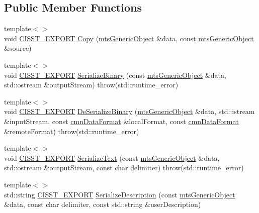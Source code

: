 \subsection*{Public Member Functions}
\begin{DoxyCompactItemize}
\item 
{\footnotesize template$<$$>$ }\\void \hyperlink{cmn_export_macros_8h_a99393e0c3ac434b2605235bbe20684f8}{C\-I\-S\-S\-T\-\_\-\-E\-X\-P\-O\-R\-T} \hyperlink{classcmn_data_a2804cf73512f6dd28850d02814f4d0ed}{Copy} (\hyperlink{classmts_generic_object}{mts\-Generic\-Object} \&data, const \hyperlink{classmts_generic_object}{mts\-Generic\-Object} \&source)
\item 
{\footnotesize template$<$$>$ }\\void \hyperlink{cmn_export_macros_8h_a99393e0c3ac434b2605235bbe20684f8}{C\-I\-S\-S\-T\-\_\-\-E\-X\-P\-O\-R\-T} \hyperlink{classcmn_data_ad1f23b9d64e2839d0a63592ee85aed32}{Serialize\-Binary} (const \hyperlink{classmts_generic_object}{mts\-Generic\-Object} \&data, std\-::ostream \&output\-Stream) throw(std\-::runtime\-\_\-error)
\item 
{\footnotesize template$<$$>$ }\\void \hyperlink{cmn_export_macros_8h_a99393e0c3ac434b2605235bbe20684f8}{C\-I\-S\-S\-T\-\_\-\-E\-X\-P\-O\-R\-T} \hyperlink{classcmn_data_af379001696641cad5bca9db8cdf2f03d}{De\-Serialize\-Binary} (\hyperlink{classmts_generic_object}{mts\-Generic\-Object} \&data, std\-::istream \&input\-Stream, const \hyperlink{classcmn_data_format}{cmn\-Data\-Format} \&local\-Format, const \hyperlink{classcmn_data_format}{cmn\-Data\-Format} \&remote\-Format) throw(std\-::runtime\-\_\-error)
\item 
{\footnotesize template$<$$>$ }\\void \hyperlink{cmn_export_macros_8h_a99393e0c3ac434b2605235bbe20684f8}{C\-I\-S\-S\-T\-\_\-\-E\-X\-P\-O\-R\-T} \hyperlink{classcmn_data_aa5321f255db70402c20ca05f1733f27d}{Serialize\-Text} (const \hyperlink{classmts_generic_object}{mts\-Generic\-Object} \&data, std\-::ostream \&output\-Stream, const char delimiter) throw(std\-::runtime\-\_\-error)
\item 
{\footnotesize template$<$$>$ }\\std\-::string \hyperlink{cmn_export_macros_8h_a99393e0c3ac434b2605235bbe20684f8}{C\-I\-S\-S\-T\-\_\-\-E\-X\-P\-O\-R\-T} \hyperlink{classcmn_data_a1c2961c2308789171187d31bc3e97171}{Serialize\-Description} (const \hyperlink{classmts_generic_object}{mts\-Generic\-Object} \&data, const char delimiter, const std\-::string \&user\-Description)

\end{DoxyCompactItemize}
